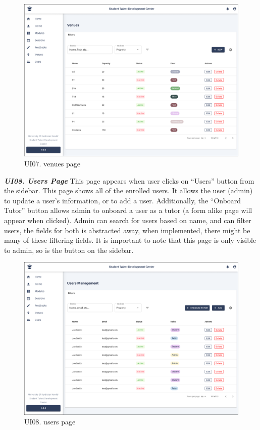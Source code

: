 \begin{justify}
    \begin{figure}[H]
    \centerline{\includegraphics[width=150mm,scale=1]{figures/analysis_and_design/design/UI/7. Venues Page (UI07).png}}
    \caption{UI07. venues page}
    \label{UI07}
    \end{figure}
    \clearpage




    \noindent\textbf{\textit{UI08. Users Page}}\newendline
    This page appears when user clicks on “Users” button from the sidebar. This page shows all of the enrolled users. It allows the user (admin) to update a user’s information, or to add a user. Additionally, the “Onboard Tutor” button allows admin to onboard a user as a tutor (a form alike page will appear when clicked). Admin can search for users based on name, and can filter users, the fields for both is abstracted away, when implemented, there might be many of these filtering fields. It is important to note that this page is only visible to admin, so is the button on the sidebar.\\

    \begin{figure}[H]
    \centerline{\includegraphics[width=150mm,scale=1]{figures/analysis_and_design/design/UI/8. Users Page (UI08).png}}
    \caption{UI08. users page}
    \label{UI08}
    \end{figure}
    \clearpage




\end{justify}
